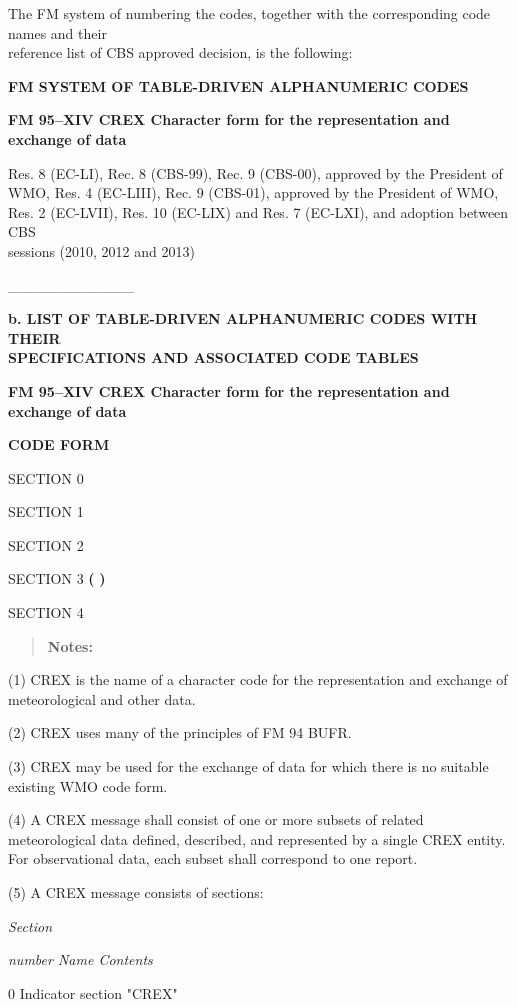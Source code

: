 The FM system of numbering the codes, together with the corresponding code names and their\\
reference list of CBS approved decision, is the following:

\textbf{FM SYSTEM OF TABLE-DRIVEN ALPHANUMERIC CODES}

\textbf{FM 95--XIV CREX Character form for the representation and exchange of data}

Res. 8 (EC-LI), Rec. 8 (CBS-99), Rec. 9 (CBS-00), approved by the President of WMO, Res. 4 (EC-LIII), Rec. 9 (CBS-01), approved by the President of WMO,\\
Res. 2 (EC-LVII), Res. 10 (EC-LIX) and Res. 7 (EC-LXI), and adoption between CBS\\
sessions (2010, 2012 and 2013)

\_\_\_\_\_\_\_\_\_\_\_\_

\textbf{b. LIST OF TABLE-DRIVEN ALPHANUMERIC CODES WITH THEIR\\
SPECIFICATIONS AND ASSOCIATED CODE TABLES}

\textbf{FM 95--XIV CREX Character form for the representation and exchange of data}

\textbf{CODE FORM}

SECTION 0

SECTION 1

SECTION 2

SECTION 3 \textbf{(} \textbf{)}

SECTION 4

\begin{quote}
\textbf{Notes:}
\end{quote}

(1) CREX is the name of a character code for the representation and exchange of meteorological and other data.

(2) CREX uses many of the principles of FM 94 BUFR.

(3) CREX may be used for the exchange of data for which there is no suitable existing WMO code form.

(4) A CREX message shall consist of one or more subsets of related meteorological data defined, described, and represented by a single CREX entity. For observational data, each subset shall correspond to one report.

(5) A CREX message consists of sections:

\emph{Section}

\emph{number Name Contents}

0 Indicator section "CREX"

